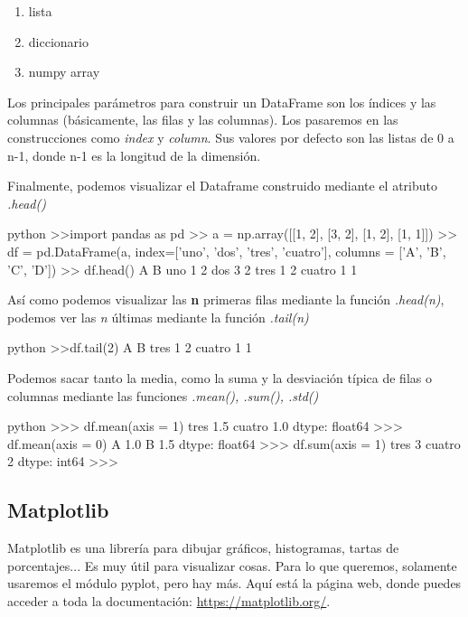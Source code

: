 \documentclass{article}
\begin{document}
\begin{enumerate}
    \item lista
    \item diccionario
    \item numpy array
\end{enumerate}

Los principales parámetros para construir un DataFrame son los índices y las columnas (básicamente, las filas y las columnas). Los pasaremos en las construcciones como \textit{index} y \textit{column}. Sus valores por defecto son las listas de 0 a n-1, donde n-1 es la longitud de la dimensión.

Finalmente, podemos visualizar el Dataframe construido mediante el atributo \textit{.head()}
\begin{mintedbox}{python}
>>import pandas as pd
>> a = np.array([[1, 2],
       [3, 2],
       [1, 2],
       [1, 1]])
>> df = pd.DataFrame(a, index=['uno', 'dos', 'tres', 'cuatro'], columns = ['A', 'B', 'C', 'D'])
>> df.head()
        A  B
uno     1  2
dos     3  2
tres    1  2
cuatro  1  1

\end{mintedbox}
Así como podemos visualizar las \textbf{n} primeras filas mediante la función \textit{.head(n)}, podemos ver las \textit{n} últimas mediante la función \textit{.tail(n)}
\begin{mintedbox}{python}
>>df.tail(2)
        A  B
tres    1  2
cuatro  1  1
\end{mintedbox}
Podemos sacar tanto la media, como la suma y la desviación típica de filas o columnas mediante las funciones \textit{.mean(), .sum(), .std()}
\begin{mintedbox}{python}
>>> df.mean(axis = 1)
tres      1.5
cuatro    1.0
dtype: float64
>>> df.mean(axis = 0)
A    1.0
B    1.5
dtype: float64
>>> df.sum(axis = 1)
tres      3
cuatro    2
dtype: int64
>>>
\end{mintedbox}

\subsection{Matplotlib}
Matplotlib es una librería para dibujar gráficos, histogramas, tartas de porcentajes... Es muy útil para visualizar cosas. Para lo que queremos, solamente usaremos el módulo pyplot, pero hay más. Aquí está la página web, donde puedes acceder a toda la documentación: \url{https://matplotlib.org/}.
\end{document}
